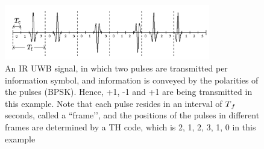 \documentclass[\main/main.tex]{subfiles}
\begin{document}
\begin{figure}[H]
    \centering
    \includegraphics[width=0.8\textwidth]{an_ir_uwb_signal}
    \caption{An IR UWB signal, in which two pulses are transmitted per information symbol, and information is conveyed by the polarities of the pulses (BPSK). Hence, +1, -1 and +1 are being transmitted in this example. Note that each pulse resides in an interval of $T\textsubscript{$f$}$ seconds, called a “frame’’, and the positions of the pulses in different frames are determined by a TH code, which is {2, 1, 2, 3, 1, 0} in this example}
    \label{fig:an_ir_uwb_signal}
\end{figure}
\end{document}
